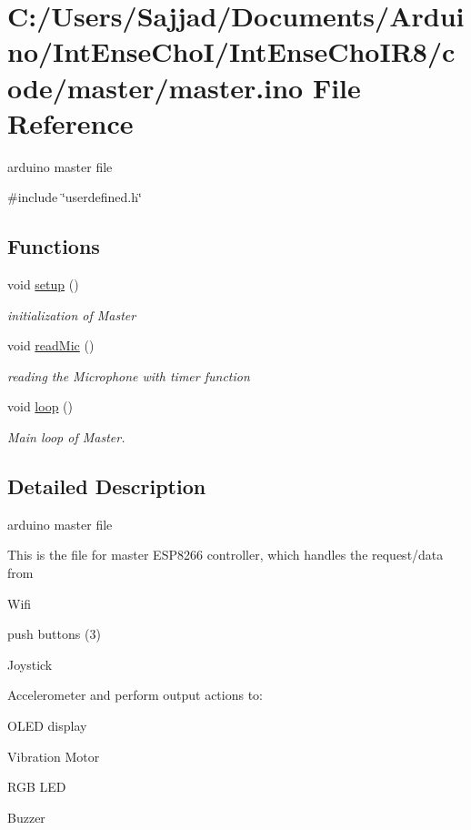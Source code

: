 \hypertarget{master_8ino}{}\section{C\+:/\+Users/\+Sajjad/\+Documents/\+Arduino/\+Int\+Ense\+Cho\+I/\+Int\+Ense\+Cho\+I\+R8/code/master/master.ino File Reference}
\label{master_8ino}


arduino master file  


{\ttfamily \#include \char`\"{}userdefined.\+h\char`\"{}}\newline
\subsection*{Functions}
\begin{DoxyCompactItemize}
\item 
void \mbox{\hyperlink{master_8ino_a4fc01d736fe50cf5b977f755b675f11d}{setup}} ()
\begin{DoxyCompactList}\small\item\em initialization of Master \end{DoxyCompactList}\item 
void \mbox{\hyperlink{master_8ino_acb567cd7c0b4da511205a0194cb9da81}{read\+Mic}} ()
\begin{DoxyCompactList}\small\item\em reading the Microphone with timer function \end{DoxyCompactList}\item 
void \mbox{\hyperlink{master_8ino_afe461d27b9c48d5921c00d521181f12f}{loop}} ()
\begin{DoxyCompactList}\small\item\em Main loop of Master. \end{DoxyCompactList}\end{DoxyCompactItemize}


\subsection{Detailed Description}
arduino master file 

This is the file for master E\+S\+P8266 controller, which handles the request/data from
\begin{DoxyItemize}
\item Wifi
\item push buttons (3)
\item Joystick
\item Accelerometer and perform output actions to\+:
\item O\+L\+ED display
\item Vibration Motor
\item R\+GB L\+ED
\item Buzzer
\end{DoxyItemize}

